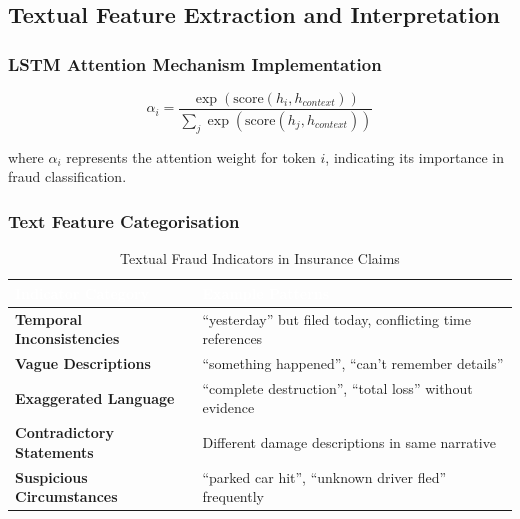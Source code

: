 \documentclass[12pt,a4paper,oneside]{report}
\numberwithin{equation}{chapter}
\renewcommand{\arraystretch}{1.6}
\begin{document}
\subsection{Textual Feature Extraction and Interpretation}
\label{sec:textual-feature}
\label{subsec:textual-feature-extraction}

\subsubsection{LSTM Attention Mechanism Implementation}

\begin{equation}
\alpha_i = \frac{\exp(\text{score}(h_i, h_{context}))}{\sum_j \exp(\text{score}(h_j, h_{context}))}
\end{equation}

where $\alpha_i$ represents the attention weight for token $i$, indicating its importance in
fraud classification.

\subsubsection{Text Feature Categorisation}

\begin{table}[H]
\centering
\caption{Textual Fraud Indicators in Insurance Claims}
\label{tab:textual_fraud_indicators}
\renewcommand{\arraystretch}{1.4}
\begin{tabular}{L{5cm} L{8cm}}
\toprule
{}
\textcolor{white}{\textbf{Indicator Category}} &
\textcolor{white}{\textbf{Example Patterns}} \\
\midrule
{}
\textbf{Temporal Inconsistencies} & ``yesterday'' but filed today, conflicting time references \\
\textbf{Vague Descriptions} & ``something happened'', ``can't remember details'' \\
\textbf{Exaggerated Language} & ``complete destruction'', ``total loss'' without evidence \\
\textbf{Contradictory Statements} & Different damage descriptions in same narrative \\
\textbf{Suspicious Circumstances} & ``parked car hit'', ``unknown driver fled'' frequently \\
\bottomrule
\end{tabular}
\end{table}

\FloatBarrier
\end{document}
